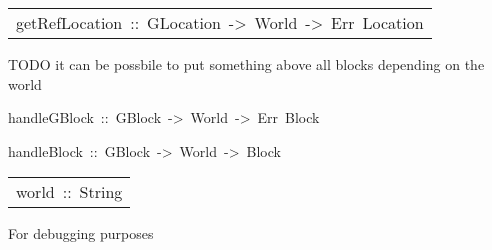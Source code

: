 \begin{haddockdesc}
\item[\begin{tabular}{@{}l}
getRefLocation\ ::\ GLocation\ ->\ World\ ->\ Err\ Location
\end{tabular}]\haddockbegindoc
TODO it can be possbile to put something above all blocks depending on the world 
\par

\end{haddockdesc}
\begin{haddockdesc}
\item[
handleGBlock\ ::\ GBlock\ ->\ World\ ->\ Err\ {\char 91}Block{\char 93}
]
\item[
handleBlock\ ::\ GBlock\ ->\ World\ ->\ {\char 91}Block{\char 93}
]
\end{haddockdesc}
\begin{haddockdesc}
\item[\begin{tabular}{@{}l}
world\ ::\ {\char 91}{\char 91}String{\char 93}{\char 93}
\end{tabular}]\haddockbegindoc
For debugging purposes 
\par

\end{haddockdesc}